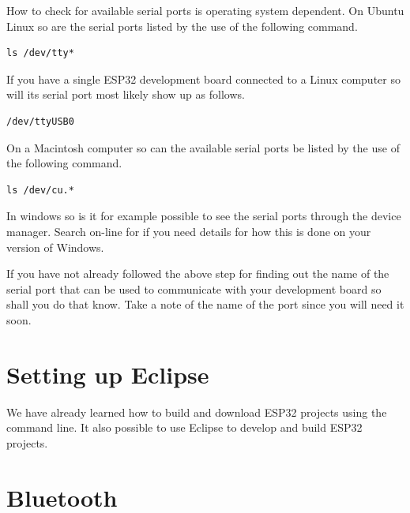 \documentclass{tufte-book}
\begin{document}
How to check for available serial ports is operating system dependent. On Ubuntu Linux so are the serial ports listed by the use of the following command.

\begin{lstlisting}
ls /dev/tty*
\end{lstlisting}

If you have a single ESP32 development board connected to a Linux computer so will its serial port most likely show up as follows.

\begin{lstlisting}
/dev/ttyUSB0
\end{lstlisting}

On a Macintosh computer so can the available serial ports be listed by the use of the following command.

\begin{lstlisting}
ls /dev/cu.*
\end{lstlisting}

In windows so is it for example possible to see the serial ports through the device manager. Search on-line for  if you need details for how this is done on your version of Windows.

If you have not already followed the above step for finding out the name of the serial port that can be used to communicate with your development board so shall you do that know. Take a note of the name of the port since you will need it soon.

\chapter{Setting up Eclipse}


We have already learned how to build and download ESP32 projects using the command line. It also possible to use Eclipse to develop and build ESP32 projects.

\chapter{Bluetooth}
\end{document}
